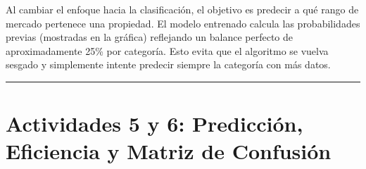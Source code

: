 \documentclass[
]{article}
\begin{document}
Al cambiar el enfoque hacia la clasificación, el objetivo es predecir a
qué rango de mercado pertenece una propiedad. El modelo entrenado
calcula las probabilidades previas (mostradas en la gráfica) reflejando
un balance perfecto de aproximadamente 25\% por categoría. Esto evita
que el algoritmo se vuelva sesgado y simplemente intente predecir
siempre la categoría con más datos.

\begin{center}\rule{0.5\linewidth}{0.5pt}\end{center}

\section{Actividades 5 y 6: Predicción, Eficiencia y Matriz de
Confusión}\label{actividades-5-y-6-predicciuxf3n-eficiencia-y-matriz-de-confusiuxf3n}
\end{document}
